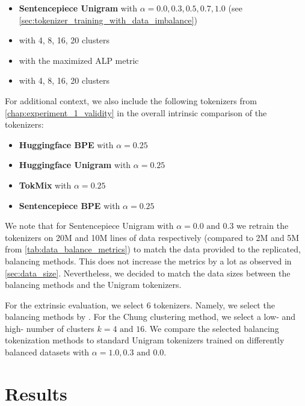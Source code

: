 \begin{itemize}
    \item \textbf{Sentencepiece Unigram} with $\alpha=0.0, 0.3, 0.5, 0.7, 1.0$ (see \autoref{sec:tokenizer_training_with_data_imbalance})
    \item \textbf{\citet{chung_improving_2020}} with 4, 8, 16, 20 clusters
    \item \textbf{\citet{zheng_allocating_2021}} with the maximized ALP metric
    \item \textbf{\citet{liang_xlm-v_2023}} with 4, 8, 16, 20 clusters
\end{itemize}

For additional context, we also include the following tokenizers from \autoref{chap:experiment_1_validity} in the overall intrinsic comparison of the tokenizers:
\begin{itemize}
    \item \textbf{Huggingface BPE} with $\alpha=0.25$
    \item \textbf{Huggingface Unigram} with $\alpha=0.25$
    \item \textbf{TokMix} with $\alpha=0.25$
    \item \textbf{Sentencepiece BPE} with $\alpha=0.25$
\end{itemize}

We note that for Sentencepiece Unigram with $\alpha=0.0\text{ and }0.3$ we retrain the tokenizers on 20M and 10M lines of data respectively (compared to 2M and 5M from \autoref{tab:data_balance_metrics}) to match the data provided to the replicated, balancing methods. This does not increase the metrics by a lot as observed in \autoref{sec:data_size}. Nevertheless, we decided to match the data sizes between the balancing methods and the Unigram tokenizers.

For the extrinsic evaluation, we select 6 tokenizers. Namely, we select the balancing methods by \citet{chung_improving_2020,zheng_allocating_2021}. For the Chung clustering method, we select a low- and high- number of clusters $k=4\text{ and }16$. We compare the selected balancing tokenization methods to standard Unigram tokenizers trained on differently balanced datasets with $\alpha=1.0, 0.3\text{ and }0.0$.


\section{Results}

